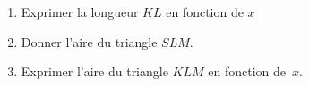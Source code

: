 
\begin{exercice}\label{exo2smath-0200}

\begin{center}
   
\end{center}
\begin{enumerate}
    \item
        Exprimer la longueur \( KL\) en fonction de \( x\)
    \item
        Donner l'aire du triangle \( SLM\).
    \item
        Exprimer l'aire du triangle \( KLM\) en fonction de~\( x\).
\end{enumerate}

\end{exercice}
